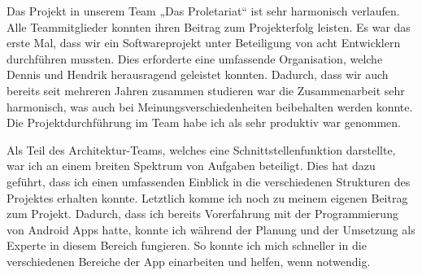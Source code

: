 Das Projekt in unserem Team „Das Proletariat“ ist sehr harmonisch verlaufen. Alle Teammitglieder konnten ihren Beitrag zum Projekterfolg leisten. Es war das erste Mal, dass wir ein Softwareprojekt unter Beteiligung von acht Entwicklern durchführen mussten. Dies erforderte eine umfassende Organisation, welche Dennis und Hendrik herausragend geleistet konnten. Dadurch, dass wir auch bereits seit mehreren Jahren zusammen studieren war die Zusammenarbeit sehr harmonisch, was auch bei Meinungsverschiedenheiten beibehalten werden konnte.  Die Projektdurchführung im Team habe ich als sehr produktiv war genommen.

Als Teil des Architektur-Teams, welches eine Schnittstellenfunktion darstellte, war ich an einem breiten Spektrum von Aufgaben beteiligt. Dies hat dazu geführt, dass ich einen umfassenden Einblick in die verschiedenen Strukturen des Projektes erhalten konnte. 
Letztlich komme ich noch zu meinem eigenen Beitrag zum Projekt. Dadurch, dass ich bereits Vorerfahrung mit der Programmierung von Android Apps hatte, konnte ich während der Planung und der Umsetzung als Experte in diesem Bereich fungieren. So konnte ich mich schneller in die verschiedenen Bereiche der App einarbeiten und helfen, wenn notwendig. 

\clearpage


